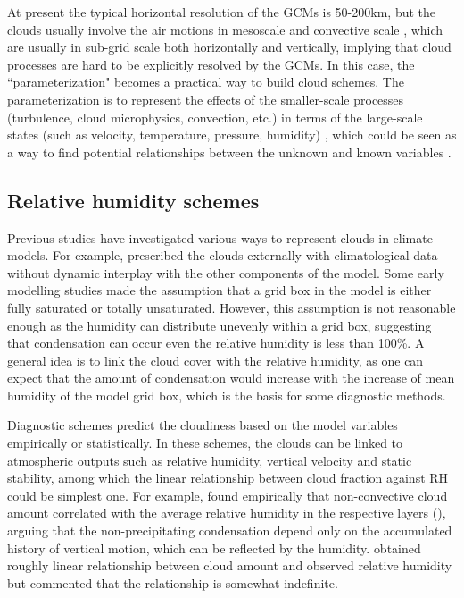 At present the typical horizontal resolution of the GCMs is 50-200km, but the clouds usually involve the air motions in mesoscale and convective scale \citep{Houze2014}, which are usually in sub-grid scale both horizontally and vertically, implying that cloud processes are hard to be explicitly resolved by the GCMs. In this case, the ``parameterization" becomes a practical way to build cloud schemes. The parameterization is to represent the effects of the smaller-scale processes (turbulence, cloud microphysics, convection, etc.) in terms of the large-scale states (such as velocity, temperature, pressure, humidity) \citep{Randall2003}, which could be seen as a way to find potential relationships between the unknown and known variables \citep{Randall1989}.


\subsection{Relative humidity schemes}
Previous studies have investigated various ways to represent clouds in climate models. For example, \cite{Holloway1971} prescribed the clouds externally with climatological data without dynamic interplay with the other components of the model. Some early modelling studies made the assumption that a grid box in the model is either fully saturated or totally unsaturated. However, this assumption is not reasonable enough as the humidity can distribute unevenly within a grid box, suggesting that condensation can occur even the relative humidity is less than 100\%. A general idea is to link the cloud cover with the relative humidity, as one can expect that the amount of condensation would increase with the increase of mean humidity of the model grid box, which is the basis for some diagnostic methods.

Diagnostic schemes predict the cloudiness based on the model variables empirically or statistically. In these schemes, the clouds can be linked to atmospheric outputs such as relative humidity, vertical velocity and static stability, among which the linear relationship between cloud fraction against RH could be simplest one. For example, \cite{Smagorinsky1960} found empirically that non-convective cloud amount correlated with the average relative humidity in the respective layers (), arguing that the non-precipitating condensation depend only on the accumulated history of vertical motion, which can be reflected by the humidity. \cite{Ricketts1973} obtained roughly linear relationship between cloud amount and observed relative humidity but commented that the relationship is somewhat indefinite.

